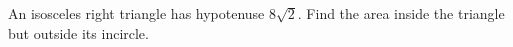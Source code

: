 An isosceles right triangle has hypotenuse $ 8\sqrt2 $. Find the area inside the triangle but outside its incircle.
